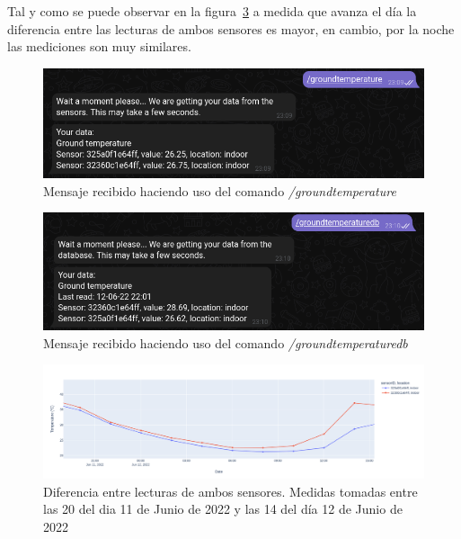 \documentclass[a4paper, 12pt, oneside]{book}
\begin{document}
Tal y como se puede observar en la figura~\ref{figura:ground_temperature_diferencias} a medida que avanza el día la diferencia entre las lecturas de ambos sensores es mayor, en cambio, por la noche las mediciones son muy similares.

\begin{figure}[H]
	\centering
    \includegraphics[width=12cm, keepaspectratio]{img/ground_temperature_telegram}
    \caption{Mensaje recibido haciendo uso del comando \textit{/groundtemperature}}
    \label{figura:ground_temperature_telegram}
\end{figure}
\begin{figure}[H]
	\centering
    \includegraphics[width=12cm, keepaspectratio]{img/ground_temperature_db_telegram}
    \caption{Mensaje recibido haciendo uso del comando \textit{/groundtemperaturedb}}
    \label{figura:ground_temperature_db_telegram}
\end{figure}

\begin{figure}[H]
	\centering
    \includegraphics[width=12cm, keepaspectratio]{img/ground_temperature_diferencias}
    \caption{Diferencia entre lecturas de ambos sensores. Medidas tomadas entre las 20 del dia 11 de Junio de 2022 y las 14 del día 12 de Junio de 2022}
    \label{figura:ground_temperature_diferencias}
\end{figure}
\end{document}
